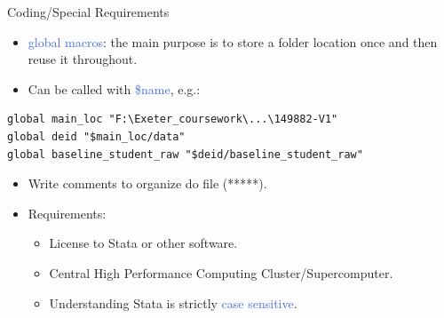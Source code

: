 \documentclass[aspectratio=169,11pt]{beamer}
\begin{document}
\begin{frame}[fragile]{Coding/Special Requirements}
  \begin{itemize}
    \item \textcolor{RoyalBlue}{global macros}: the main purpose is to store a folder location once and then reuse it throughout.
    \item Can be called with \textcolor{RoyalBlue}{\$name}, e.g.:
  \end{itemize}

  \vspace{0.5pt}
  {\footnotesize
  \begin{verbatim}
global main_loc "F:\Exeter_coursework\...\149882-V1"
global deid "$main_loc/data"
global baseline_student_raw "$deid/baseline_student_raw"
  \end{verbatim}
  }
  \begin{itemize}
      \item Write comments to organize do file (*****).
      \item Requirements: 
      \begin{itemize}
          \item License to Stata or other software.
          \item Central High Performance Computing Cluster/Supercomputer.
          \item Understanding Stata is strictly \textcolor{RoyalBlue}{case sensitive}.
          
      \end{itemize}
  \end{itemize}
\end{frame}
\end{document}
